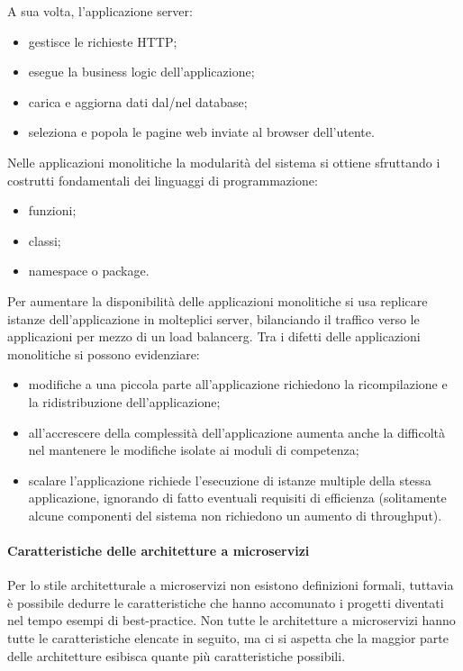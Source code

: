 A sua volta, l'applicazione server:
\begin{itemize}
  \item gestisce le richieste HTTP;
  \item esegue la business logic dell'applicazione;
  \item carica e aggiorna dati dal/nel database;
  \item seleziona e popola le pagine web inviate al browser dell'utente.
\end{itemize}


Nelle applicazioni monolitiche la modularità del sistema si ottiene sfruttando i costrutti fondamentali dei linguaggi di programmazione:
\begin{itemize}
  \item funzioni;
  \item classi;
  \item namespace o package.
\end{itemize}


Per aumentare la disponibilità delle applicazioni monolitiche si usa replicare istanze dell'applicazione in molteplici server, bilanciando il traffico verso le applicazioni per mezzo di un \gls{load balancerg}.
Tra i difetti delle applicazioni monolitiche si possono evidenziare:
\begin{itemize}
  \item modifiche a una piccola parte all'applicazione richiedono la ricompilazione e la ridistribuzione dell'applicazione;
  \item all'accrescere della complessità dell'applicazione aumenta anche la difficoltà nel mantenere le modifiche isolate ai moduli di competenza;
  \item scalare l'applicazione richiede l'esecuzione di istanze multiple della stessa applicazione, ignorando di fatto eventuali requisiti di efficienza (solitamente alcune componenti del sistema non richiedono un aumento di throughput).
\end{itemize}

\paragraph{Caratteristiche delle architetture a microservizi}

Per lo stile architetturale a microservizi non esistono definizioni formali, tuttavia è possibile dedurre le caratteristiche che hanno accomunato i progetti diventati nel tempo esempi di best-practice.
Non tutte le architetture a microservizi hanno tutte le caratteristiche elencate in seguito, ma ci si aspetta che la maggior parte delle architetture esibisca quante più caratteristiche possibili.

